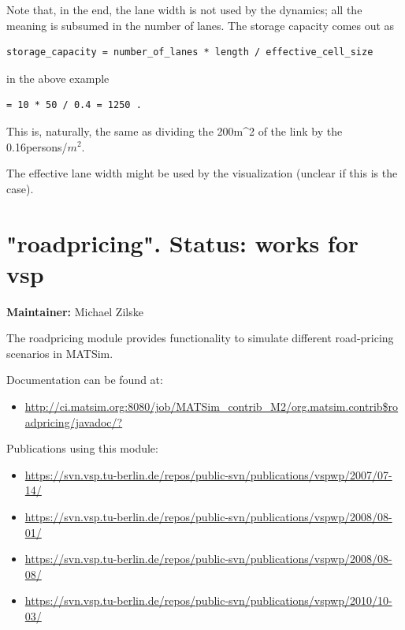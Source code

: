 Note that, in the end, the lane width is not used by the  dynamics; all the meaning is subsumed in the number of lanes. The  storage capacity comes out as
\begin{verbatim}
storage_capacity = number_of_lanes * length / effective_cell_size

\end{verbatim}

in the above example
\begin{verbatim}
= 10 * 50 / 0.4 = 1250 .

\end{verbatim}

This is, naturally, the same as dividing the 200m\textasciicircum2 of the link by the 0.16persons/$m^2$.

The effective lane width might be used by the visualization (unclear if this is the case).

\vfill\eject
\section{"roadpricing".  Status: works for vsp}

\textbf{Maintainer:} Michael Zilske

The roadpricing module provides functionality to simulate different road-pricing scenarios in MATSim.

Documentation can be found at:
\begin{itemize}
	\item \href{http://ci.matsim.org:8080/job/MATSim_contrib_M2/org.matsim.contrib$roadpricing/javadoc/?}{http://ci.matsim.org:8080/job/MATSim\_contrib\_M2/org.matsim.contrib\$roadpricing/javadoc/?}
\end{itemize}

Publications using this module:
\begin{itemize}
	\item \href{https://svn.vsp.tu-berlin.de/repos/public-svn/publications/vspwp/2007/07-14/}{https://svn.vsp.tu-berlin.de/repos/public-svn/publications/vspwp/2007/07-14/}
	\item \href{https://svn.vsp.tu-berlin.de/repos/public-svn/publications/vspwp/2008/08-01/}{https://svn.vsp.tu-berlin.de/repos/public-svn/publications/vspwp/2008/08-01/}
	\item \href{https://svn.vsp.tu-berlin.de/repos/public-svn/publications/vspwp/2008/08-08/}{https://svn.vsp.tu-berlin.de/repos/public-svn/publications/vspwp/2008/08-08/}
	\item \href{https://svn.vsp.tu-berlin.de/repos/public-svn/publications/vspwp/2010/10-03/}{https://svn.vsp.tu-berlin.de/repos/public-svn/publications/vspwp/2010/10-03/}
\end{itemize}



